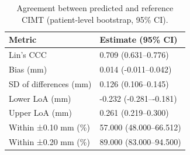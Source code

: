 \begin{table}
\caption{Agreement between predicted and reference CIMT (patient-level bootstrap, 95\% CI).}
\label{tab:regression_agreement}
\begin{tabular}{ll}
\toprule
Metric & Estimate (95\% CI) \\
\midrule
Lin's CCC & 0.709 (0.631–0.776) \\
Bias (mm) & 0.014 (-0.011–0.042) \\
SD of differences (mm) & 0.126 (0.106–0.145) \\
Lower LoA (mm) & -0.232 (-0.281–-0.181) \\
Upper LoA (mm) & 0.261 (0.219–0.300) \\
Within ±0.10 mm (\%) & 57.000 (48.000–66.512) \\
Within ±0.20 mm (\%) & 89.000 (83.000–94.500) \\
\bottomrule
\end{tabular}
\end{table}
